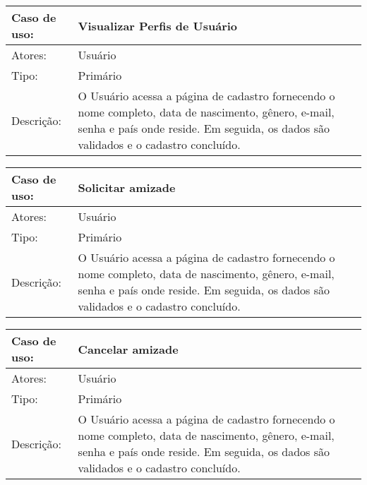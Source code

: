 \documentclass[12pt,a4paper,onecolumn,titlepage]{article}
\begin{document}
\newpage

\begin{table}[h!]
\begin{center}
\begin{tabular}{p{2.5cm} p{9.5cm}}
Caso de uso: & \textbf{Visualizar Perfis de Usuário} \\ \hline
Atores: & Usuário \\ \hline
Tipo: & Primário \\ \hline
Descrição: & O Usuário acessa a página de cadastro fornecendo o nome completo, data de nascimento, gênero, e-mail, senha e país onde reside. Em seguida, os dados são validados e o cadastro concluído.
\end{tabular}
\end{center}
\end{table}

\newpage

\begin{table}[h!]
\begin{center}
\begin{tabular}{p{2.5cm} p{9.5cm}}
Caso de uso: & \textbf{Solicitar amizade} \\ \hline
Atores: & Usuário \\ \hline
Tipo: & Primário \\ \hline
Descrição: & O Usuário acessa a página de cadastro fornecendo o nome completo, data de nascimento, gênero, e-mail, senha e país onde reside. Em seguida, os dados são validados e o cadastro concluído.
\end{tabular}
\end{center}
\end{table}

\newpage

\begin{table}[h!]
\begin{center}
\begin{tabular}{p{2.5cm} p{9.5cm}}
Caso de uso: & \textbf{Cancelar amizade} \\ \hline
Atores: & Usuário \\ \hline
Tipo: & Primário \\ \hline
Descrição: & O Usuário acessa a página de cadastro fornecendo o nome completo, data de nascimento, gênero, e-mail, senha e país onde reside. Em seguida, os dados são validados e o cadastro concluído.
\end{tabular}
\end{center}
\end{table}
\end{document}
